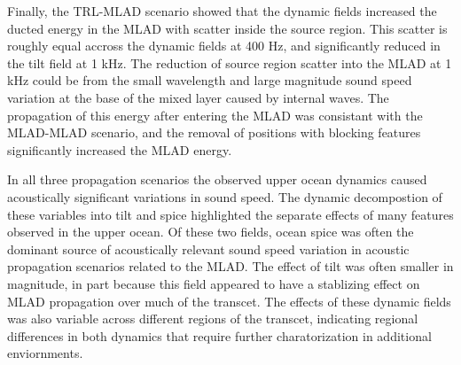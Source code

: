 \documentclass[preprint,NumberedRefs]{JASA}
\begin{document}
Finally, the TRL-MLAD scenario showed that the dynamic fields increased the ducted energy in the MLAD with scatter inside the source region. This scatter is roughly equal accross the dynamic fields at 400 Hz, and significantly reduced in the tilt field at 1 kHz. The reduction of source region scatter into the MLAD at 1 kHz could be from the small wavelength and large magnitude sound speed variation at the base of the mixed layer caused by internal waves. The propagation of this energy after entering the MLAD was consistant with the MLAD-MLAD scenario, and the removal of positions with blocking features significantly increased the MLAD energy.

In all three propagation scenarios the observed upper ocean dynamics caused acoustically significant variations in sound speed. The dynamic decompostion of these variables into tilt and spice highlighted the separate effects of many features observed in the upper ocean. Of these two fields, ocean spice was often the dominant source of acoustically relevant sound speed variation in acoustic propagation scenarios related to the MLAD. The effect of tilt was often smaller in magnitude, in part because this field appeared to have a stablizing effect on MLAD propagation over much of the transcet. The effects of these dynamic fields was also variable across different regions of the transcet, indicating regional differences in both dynamics that require further charatorization in additional enviornments.




\end{document}
